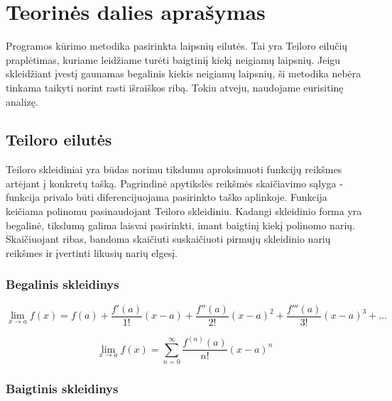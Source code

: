 \section{Teorinės dalies aprašymas}






Programos kūrimo metodika pasirinkta laipsnių eilutės. 
Tai yra Teiloro eilučių praplėtimas, kuriame leidžiame turėti baigtiniį kiekį neigiamų laipsnių. 
Jeigu skleidžiant įvestį gaunamas begalinis kiekis neigiamų laipsnių, ši metodika nebėra tinkama taikyti norint rasti išraiškos ribą.
Tokiu atveju, naudojame eurisitinę analizę. 

\subsection{Teiloro eilutės}

	Teiloro skleidiniai yra būdas norimu tikslumu aproksimuoti funkcijų reikšmes artėjant į konkretų tašką.
	Pagrindinė apytikslės reikšmės skaičiavimo sąlyga - funkcija privalo būti diferencijuojama pasirinkto taško aplinkoje.
	Funkcija keičiama polinomu pasinaudojant Teiloro skleidiniu.
	Kadangi skleidinio forma yra begalinė, tikslumą galima laisvai pasirinkti, imant baigtinį kiekį polinomo narių. 
	Skaičiuojant ribas, bandoma skaičiuti suskaičiuoti pirmujų skleidinio narių reikšmes ir įvertinti likusių narių elgesį. 

	\subsubsection*{Begalinis skleidinys}

	\[\lim_{x \to a} f(x) = f(a) + \frac{f'(a)}{1!}(x-a)+\frac{f''(a)}{2!}(x-a)^2 + \frac{f'''(a)}{3!}(x-a)^3 + ...\]

	\[\lim_{x \to a} f(x) = \sum_{n=0}^{\infty} \frac{f^{(n)}(a)}{n!}(x-a)^n\]

\subsubsection*{Baigtinis skleidinys}

